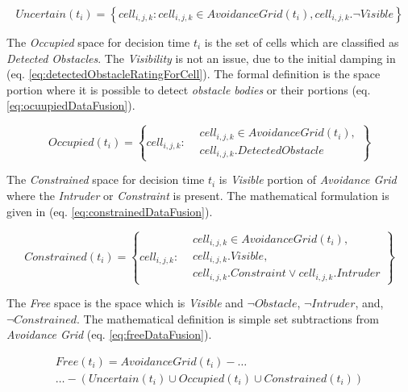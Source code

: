 \begin{equation}\label{eq:UncertainDataFusion}
    Uncertain(t_i) = \left\{cell_{i,j,k}:cell_{i,j,k}\in AvoidanceGrid(t_i),cell_{i,j,k}.\neg Visible \right\}
\end{equation}

\noindent The \emph{Occupied} space for decision time $t_i$ is the set of cells which are classified as \emph{Detected Obstacles}. The \emph{Visibility} is not an issue, due to the initial damping in (eq. \ref{eq:detectedObstacleRatingForCell}). The formal definition is the space portion where it is possible to detect \emph{obstacle bodies} or their portions (eq. \ref{eq:ocuupiedDataFusion}).

\begin{equation}\label{eq:ocuupiedDataFusion}
    Occupied(t_i) = \left\{cell_{i,j,k}:\begin{aligned}&cell_{i,j,k}\in AvoidanceGrid(t_i),\\&cell_{i,j,k}.DetectedObstacle\end{aligned}\right\}
\end{equation}

\noindent The \emph{Constrained} space for decision time $t_i$ is \emph{Visible} portion of \emph{Avoidance Grid} where the \emph{Intruder} or \emph{Constraint} is present. The mathematical formulation is given in (eq. \ref{eq:constrainedDataFusion}).

\begin{equation}\label{eq:constrainedDataFusion}
    Constrained(t_i) = \left\{cell_{i,j,k}:
    \begin{aligned}
        &cell_{i,j,k} \in AvoidanceGrid(t_i),\\
        &cell_{i,j,k}.Visible,\\
        &cell_{i,j,k}.Constraint \vee cell_{i,j,k}.Intruder
    \end{aligned}\right\}
\end{equation}

\noindent The \emph{Free} space is the space which is \emph{Visible} and $\neg Obstacle$,  $\neg Intruder$, and, $\neg Constrained$. The mathematical definition is simple set subtractions from \emph{Avoidance Grid} (eq. \ref{eq:freeDataFusion}).

\begin{multline}\label{eq:freeDataFusion}
    Free(t_i) = AvoidanceGrid(t_i) -\dots\\\dots -\left(Uncertain(t_i)\cup Occupied(t_i)\cup  Constrained(t_i)\right)
\end{multline}

